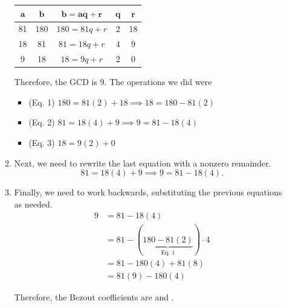\documentclass[letterpaper]{article}
\newcommand{\0}{\mathbf{0}}
\begin{document}
\begin{mdframed}
\begin{itemize}
\begin{mdframed}
\begin{enumerate}
                \begin{center}
                    \begin{tabular}{|c|c|c|c|c|}
                        \hline 
                        $\mathbf{a}$ & $\mathbf{b}$ & $\mathbf{b = aq + r}$ & $\mathbf{q}$ & $\mathbf{r}$ \\ 
                        \hline 
                        81 & 180 & $180 = 81q + r$ & 2 & 18 \\ 
                        18 & 81 & $81 = 18q + r$ & 4 & 9 \\ 
                        9 & 18 & $18 = 9q + r$ & 2 & 0 \\ 
                        \hline 
                    \end{tabular}
                \end{center}
                Therefore, the GCD is 9. The operations we did were 
                \begin{itemize}
                    \item (Eq. 1) $180 = 81(2) + 18 \implies 18 = 180 - 81(2)$
                    \item (Eq. 2) $81 = 18(4) + 9 \implies 9 = 81 - 18(4)$ 
                    \item (Eq. 3) $18 = 9(2) + 0$
                \end{itemize}
        


                \item Next, we need to rewrite the last equation with a nonzero remainder. 
                \[81 = 18(4) + 9 \implies 9 = 81 - 18(4).\]

                \item Finally, we need to work backwards, substituting the previous equations as needed. 
                \begin{equation*}
                    \begin{aligned}
                        9 &= 81 - 18(4) \\ 
                            &= 81 - (\underbrace{180 - 81(2)}_{\text{Eq. 1}}) \cdot 4 \\ 
                            &= 81 - 180(4) + 81(8) \\ 
                            &= 81(9) - 180(4) 
                    \end{aligned}
                \end{equation*}

                Therefore, the Bezout coefficients are  and .
            \end{enumerate}




\end{mdframed}
\end{itemize}
\end{mdframed}
\end{document}

